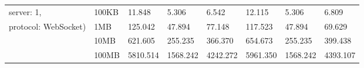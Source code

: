 \begin{table}[htbp]
\begin{tabular}{m{} m{} m{} m{} m{} m{} m{} m{}}
    server: 1,                       & 100KB      & 11.848            & 5.306    & 6.542                   & 12.115            & 5.306    & 6.809                   \\
    protocol: WebSocket)             & 1MB        & 125.042           & 47.894   & 77.148                  & 117.523           & 47.894   & 69.629                  \\
                                     & 10MB       & 621.605           & 255.235  & 366.370                 & 654.673           & 255.235  & 399.438                 \\
                                     & 100MB      & 5810.514          & 1568.242 & 4242.272                & 5961.350          & 1568.242 & 4393.107               
    \end{tabular}%
    \end{table}




